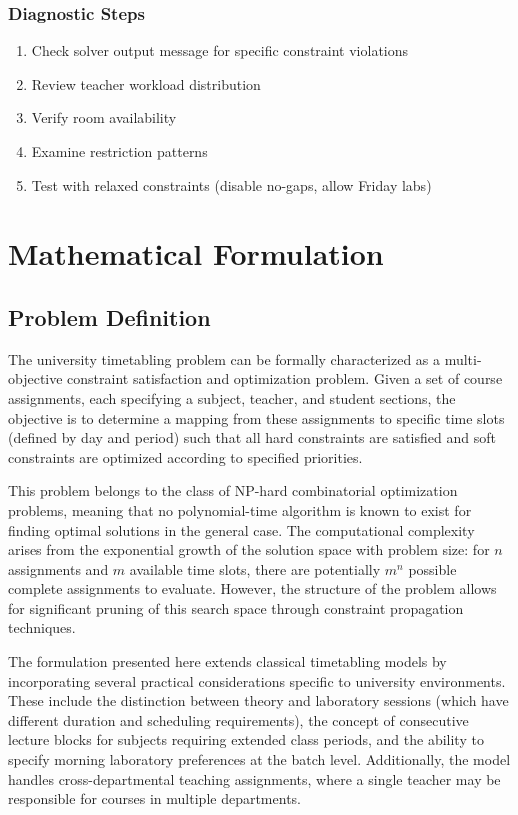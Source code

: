 \documentclass[12pt,a4paper]{article}
\begin{document}
\subsubsection{Diagnostic Steps}
\begin{enumerate}
    \item Check solver output message for specific constraint violations
    \item Review teacher workload distribution
    \item Verify room availability
    \item Examine restriction patterns
    \item Test with relaxed constraints (disable no-gaps, allow Friday labs)
\end{enumerate}


\section{Mathematical Formulation}

\subsection{Problem Definition}

The university timetabling problem can be formally characterized as a multi-objective constraint satisfaction and optimization problem. Given a set of course assignments, each specifying a subject, teacher, and student sections, the objective is to determine a mapping from these assignments to specific time slots (defined by day and period) such that all hard constraints are satisfied and soft constraints are optimized according to specified priorities.

This problem belongs to the class of NP-hard combinatorial optimization problems, meaning that no polynomial-time algorithm is known to exist for finding optimal solutions in the general case. The computational complexity arises from the exponential growth of the solution space with problem size: for $n$ assignments and $m$ available time slots, there are potentially $m^n$ possible complete assignments to evaluate. However, the structure of the problem allows for significant pruning of this search space through constraint propagation techniques.

The formulation presented here extends classical timetabling models by incorporating several practical considerations specific to university environments. These include the distinction between theory and laboratory sessions (which have different duration and scheduling requirements), the concept of consecutive lecture blocks for subjects requiring extended class periods, and the ability to specify morning laboratory preferences at the batch level. Additionally, the model handles cross-departmental teaching assignments, where a single teacher may be responsible for courses in multiple departments.
\end{document}
